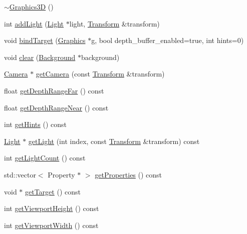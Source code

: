 \begin{CompactItemize}
\item 
\hyperlink{classm3g_1_1Graphics3D_9b9347476fc10e57b31694ac8a628511}{$\sim$Graphics3D} ()
\item 
int \hyperlink{classm3g_1_1Graphics3D_e210cacb72c8540df86a6674e3c2dc4f}{addLight} (\hyperlink{classm3g_1_1Light}{Light} $\ast$light, \hyperlink{classm3g_1_1Transform}{Transform} \&transform)
\item 
void \hyperlink{classm3g_1_1Graphics3D_2173e179f4b2d7130cde46a48794ee66}{bindTarget} (\hyperlink{classm3g_1_1Graphics}{Graphics} $\ast$g, bool depth\_\-buffer\_\-enabled=true, int hints=0)
\item 
void \hyperlink{classm3g_1_1Graphics3D_21c4a68a53cfbe0a7cec05d5a56682bf}{clear} (\hyperlink{classm3g_1_1Background}{Background} $\ast$background)
\item 
\hyperlink{classm3g_1_1Camera}{Camera} $\ast$ \hyperlink{classm3g_1_1Graphics3D_570b81f426d1b2b5e8794cffb33422c6}{getCamera} (const \hyperlink{classm3g_1_1Transform}{Transform} \&transform)
\item 
float \hyperlink{classm3g_1_1Graphics3D_c8c185b99073215202d2e35723f5c470}{getDepthRangeFar} () const 
\item 
float \hyperlink{classm3g_1_1Graphics3D_60bc116f673bf2782de2df3eebfb2c92}{getDepthRangeNear} () const 
\item 
int \hyperlink{classm3g_1_1Graphics3D_5837234a23dc5f46d3adec17f521b58e}{getHints} () const 
\item 
\hyperlink{classm3g_1_1Light}{Light} $\ast$ \hyperlink{classm3g_1_1Graphics3D_04272e584440c89fb4cb449003a84e7d}{getLight} (int index, const \hyperlink{classm3g_1_1Transform}{Transform} \&transform) const 
\item 
int \hyperlink{classm3g_1_1Graphics3D_7a08cfeb48d76ad5d8859a1fc0c77d98}{getLightCount} () const 
\item 
std::vector$<$ Property $\ast$ $>$ \hyperlink{classm3g_1_1Graphics3D_d87d3f8145ea47e2b736c6c3525dad5c}{getProperties} () const 
\item 
void $\ast$ \hyperlink{classm3g_1_1Graphics3D_02d0033930c8e68f4d7ebd43abe7980a}{getTarget} () const 
\item 
int \hyperlink{classm3g_1_1Graphics3D_d51e0c421126f5deb61b359cdb7dab2e}{getViewportHeight} () const 
\item 
int \hyperlink{classm3g_1_1Graphics3D_768e5c057e2fa4c4b17a67134abbf89f}{getViewportWidth} () const 
\item 

\end{CompactItemize}
